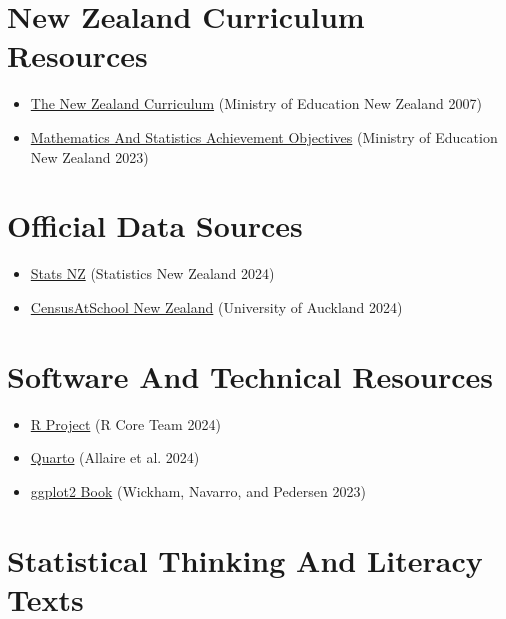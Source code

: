 \documentclass[
  11pt,
  a4paper,
  oneside,
  open=any]{scrbook}
\providecommand{\tightlist}{%
  \setlength{\itemsep}{0pt}\setlength{\parskip}{0pt}}
\begin{document}
\section{New Zealand Curriculum
Resources}\label{new-zealand-curriculum-resources}

\begin{itemize}
\tightlist
\item
  \href{https://nzcurriculum.tki.org.nz}{The New Zealand Curriculum}
  (Ministry of Education New Zealand 2007)
\item
  \href{https://nzcurriculum.tki.org.nz/The-New-Zealand-Curriculum/Mathematics-and-statistics}{Mathematics
  And Statistics Achievement Objectives} (Ministry of Education New
  Zealand 2023)
\end{itemize}

\section{Official Data Sources}\label{official-data-sources}

\begin{itemize}
\tightlist
\item
  \href{https://www.stats.govt.nz}{Stats NZ} (Statistics New Zealand
  2024)
\item
  \href{https://new.censusatschool.org.nz}{CensusAtSchool New Zealand}
  (University of Auckland 2024)
\end{itemize}

\section{Software And Technical
Resources}\label{software-and-technical-resources}

\begin{itemize}
\tightlist
\item
  \href{https://www.r-project.org}{R Project} (R Core Team 2024)
\item
  \href{https://quarto.org}{Quarto} (Allaire et al. 2024)
\item
  \href{https://ggplot2-book.org}{ggplot2 Book} (Wickham, Navarro, and
  Pedersen 2023)
\end{itemize}

\section{Statistical Thinking And Literacy
Texts}\label{statistical-thinking-and-literacy-texts}
\end{document}
